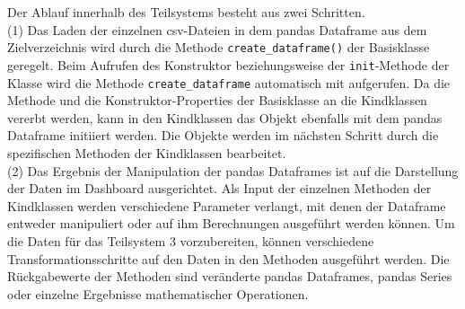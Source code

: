     Der Ablauf innerhalb des Teilsystems besteht aus zwei Schritten.\\
    (1) Das Laden der einzelnen csv-Dateien in dem pandas Dataframe aus dem Zielverzeichnis wird durch die Methode \texttt{create\_dataframe()} der Basisklasse geregelt.
    Beim Aufrufen des Konstruktor beziehungsweise der \texttt{init}-Methode der Klasse wird die Methode \texttt{create\_dataframe} 
    automatisch mit aufgerufen. Da die Methode und die Konstruktor-Properties der Basisklasse an die Kindklassen vererbt werden, kann in den Kindklassen das Objekt ebenfalls mit dem 
    pandas Dataframe initiiert werden. Die Objekte werden im nächsten Schritt durch die spezifischen Methoden der Kindklassen bearbeitet.\\
    (2) Das Ergebnis der Manipulation der pandas Dataframes ist auf die Darstellung der Daten im Dashboard ausgerichtet. Als Input der einzelnen Methoden der
    Kindklassen werden verschiedene Parameter verlangt, mit denen der Dataframe entweder manipuliert oder auf ihm Berechnungen ausgeführt werden können. 
    Um die Daten für das Teilsystem 3 vorzubereiten, können verschiedene Transformationsschritte auf den Daten in den Methoden ausgeführt werden. 
    Die Rückgabewerte der Methoden sind veränderte pandas Dataframes, pandas Series oder einzelne Ergebnisse mathematischer Operationen.
    
    

        

    

